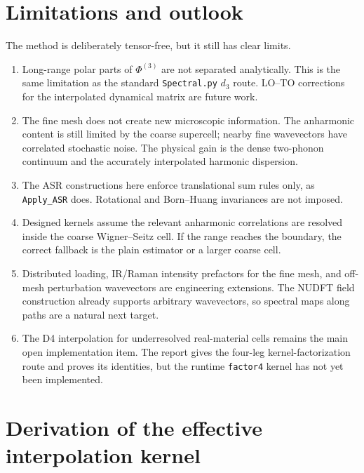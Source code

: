 \documentclass[11pt,a4paper]{article}
\begin{document}
\section{Limitations and outlook}
\label{sec:outlook}

The method is deliberately tensor-free, but it still has clear limits.
\begin{enumerate}
\item Long-range polar parts of $\Phi^{(3)}$ are not separated
analytically.  This is the same limitation as the standard
\texttt{Spectral.py} $d_3$ route.  LO--TO corrections for the interpolated
dynamical matrix are future work.
\item The fine mesh does not create new microscopic information.  The
anharmonic content is still limited by the coarse supercell; nearby fine
wavevectors have correlated stochastic noise.  The physical gain is the
dense two-phonon continuum and the accurately interpolated harmonic
dispersion.
\item The ASR constructions here enforce translational sum rules only, as
\texttt{Apply\_ASR} does.  Rotational and Born--Huang invariances are not
imposed.
\item Designed kernels assume the relevant anharmonic correlations are
resolved inside the coarse Wigner--Seitz cell.  If the range reaches the
boundary, the correct fallback is the plain estimator or a larger coarse
cell.
\item Distributed loading, IR/Raman intensity prefactors for the fine mesh,
and off-mesh perturbation wavevectors are engineering extensions.  The NUDFT
field construction already supports arbitrary wavevectors, so spectral maps
along paths are a natural next target.
\item The D4 interpolation for underresolved real-material cells remains the
main open implementation item.  The report gives the four-leg
kernel-factorization route and proves its identities, but the runtime
\texttt{factor4} kernel has not yet been implemented.
\end{enumerate}

\appendix
\section{Derivation of the effective interpolation kernel}
\label{app:kernel}
\end{document}
